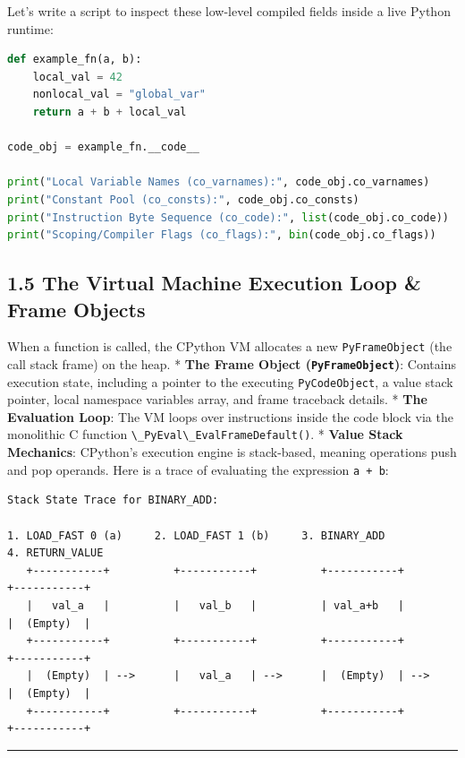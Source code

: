 Let's write a script to inspect these low-level compiled fields inside a
live Python runtime:

\begin{lstlisting}[language=Python]
def example_fn(a, b):
    local_val = 42
    nonlocal_val = "global_var"
    return a + b + local_val

code_obj = example_fn.__code__

print("Local Variable Names (co_varnames):", code_obj.co_varnames)
print("Constant Pool (co_consts):", code_obj.co_consts)
print("Instruction Byte Sequence (co_code):", list(code_obj.co_code))
print("Scoping/Compiler Flags (co_flags):", bin(code_obj.co_flags))
\end{lstlisting}

\hypertarget{the-virtual-machine-execution-loop-frame-objects}{%
\subsection{1.5 The Virtual Machine Execution Loop \& Frame
Objects}\label{the-virtual-machine-execution-loop-frame-objects}}

When a function is called, the CPython VM allocates a new
\passthrough{\lstinline!PyFrameObject!} (the call stack frame) on the
heap. * \textbf{The Frame Object
(\passthrough{\lstinline!PyFrameObject!})}: Contains execution state,
including a pointer to the executing
\passthrough{\lstinline!PyCodeObject!}, a value stack pointer, local
namespace variables array, and frame traceback details. * \textbf{The
Evaluation Loop}: The VM loops over instructions inside the code block
via the monolithic C function
\passthrough{\lstinline!\_PyEval\_EvalFrameDefault()!}. * \textbf{Value
Stack Mechanics}: CPython's execution engine is stack-based, meaning
operations push and pop operands. Here is a trace of evaluating the
expression \passthrough{\lstinline!a + b!}:

\begin{lstlisting}
Stack State Trace for BINARY_ADD:

1. LOAD_FAST 0 (a)     2. LOAD_FAST 1 (b)     3. BINARY_ADD          4. RETURN_VALUE
   +-----------+          +-----------+          +-----------+          +-----------+
   |   val_a   |          |   val_b   |          | val_a+b   |          |  (Empty)  |
   +-----------+          +-----------+          +-----------+          +-----------+
   |  (Empty)  | -->      |   val_a   | -->      |  (Empty)  | -->      |  (Empty)  |
   +-----------+          +-----------+          +-----------+          +-----------+
\end{lstlisting}

\begin{center}\rule{0.5\linewidth}{0.5pt}\end{center}
